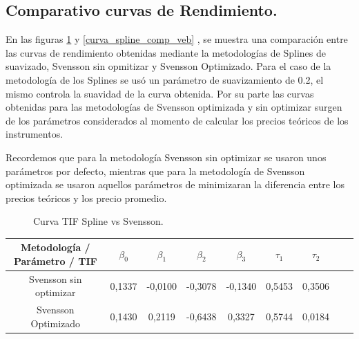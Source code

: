 \newpage

\subsection{Comparativo curvas de Rendimiento.}\hspace{5cm}

\hspace{0.4cm} En las figuras \ref{curva_spline_comp_tif} y \ref{curva_spline_comp_veb} , se muestra una comparaci\'on entre las curvas de rendimiento obtenidas mediante la metodolog\'ias de Splines de suavizado, Svensson sin opmitizar y Svensson Optimizado.
Para el caso de la metodolog\'ia de los Splines se us\'o un par\'ametro de suavizamiento de 0.2, el mismo controla la suavidad de la curva obtenida. Por su parte las curvas obtenidas para las metodolog\'ias de Svensson optimizada y sin optimizar surgen de los par\'ametros considerados al momento de calcular los precios te\'oricos de los instrumentos.

\hspace{0.4cm}Recordemos que para la metodolog\'ia Svensson sin optimizar se usaron unos par\'ametros por defecto, mientras que para la metodolog\'ia de Svensson optimizada se usaron aquellos par\'ametros de minimizaran la diferencia entre los precios te\'oricos y los precio promedio. 

\newpage

\begin{figure}[h]
\caption{Curva TIF Spline vs Svensson.}
\label{curva_spline_comp_tif}
\end{figure}


\begin{center}
{\begin{tabular}[t]{|c |c |c |c |c |c |c |c |r|}
\hline
Metodolog\'ia / Par\'ametro / TIF & $\beta_{0}$ & $\beta_{1}$ & $\beta_{2}$ & $\beta_{3}$  &  $\tau_{1}$ & $\tau_{2}$ \\
\hline
Svensson sin optimizar & 0,1337 & -0,0100 & -0,3078 & -0,1340  & 0,5453 & 0,3506\\
\hline
Svensson Optimizado & 0,1430 & 0,2119 & -0,6438 & 0,3327 & 0,5744 & 0,0184 \\
\hline
\end{tabular}}
\end{center}




